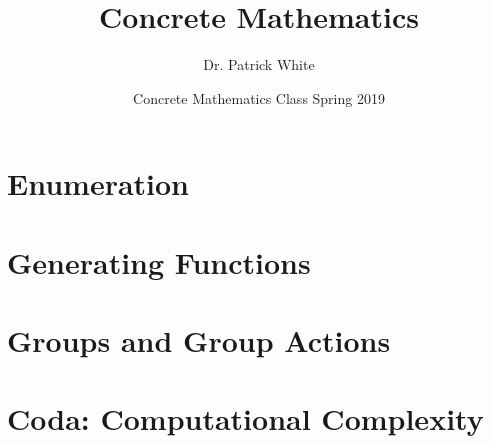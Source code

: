 \documentclass[12pt, titlepage]{article}
\title{Concrete Mathematics}
\author{Dr. Patrick White}
\date{Concrete Mathematics Class Spring 2019} %
\begin{document}
\maketitle

\tableofcontents

\newpage

\part{Enumeration}







 







\newpage 

\part{Generating Functions}
% 

\part{Groups and Group Actions}

\part{Coda: Computational Complexity}
\end{document}
